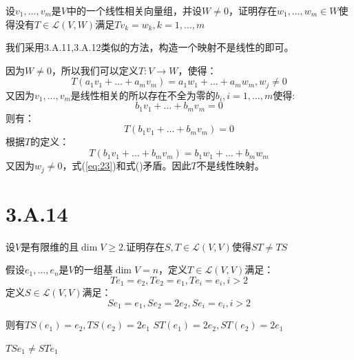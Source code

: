 \documentclass[10pt,a4paper,UTF8]{article}
\begin{document}
\begin{problem}
设\(v_{1},\ldots ,v_{m}\)是\(V\)中的一个线性相关向量组，并设\(W\neq 0\)，证明存在\(w_{1},\ldots ,w_{m}\in W\)使得没有\(T\in \mathcal{L}(V,W)\)满足\(Tv_{k} = w_{k},k=1,\ldots ,m\)
\end{problem}

\begin{answer}
我们采用3.A.11,3.A.12类似的方法，构造一个映射不是线性的即可。

因为\(W\neq 0\)，所以我们可以定义\(T:V\rightarrow W\)，使得：
\begin{equation}
\label{eq:22}
T(a_{1}v_{1} + \ldots + a_{m}v_{m}) = a_{1}w_{1} + \ldots + a_{m}w_{m}, w_{j}\neq 0
\end{equation}
又因为\(v_{1},\ldots ,v_{m}\)是线性相关的所以存在不全为零的\(b_{i},i=1,\ldots ,m\)使得:
\begin{equation}
\label{eq:23}
b_{1}v_{1} + \ldots + b_{m}v_{m} = 0
\end{equation}
则有：
\begin{equation}
\label{eq:24}
T(b_{1}v_{1} + \ldots + b_{m}v_{m}) = 0
\end{equation}
根据\(T\)的定义：
\begin{equation}
\label{eq:25}
T(b_{1}v_{1} + \ldots + b_{m}v_{m}) = b_{1}w_{1} + \ldots + b_{m}w_{m}
\end{equation}
又因为\(w_{j}\neq 0\)，式(\ref{eq:23})和式()矛盾。因此\(T\)不是线性映射。
\end{answer}

\section{3.A.14}
\label{sec:orgb67a255}


\begin{problem}
设\(V\)是有限维的且\(\dim V \geq 2\).证明存在\(S,T\in \mathcal{L}(V,V)\)使得\(ST\neq TS\)
\end{problem}

\begin{answer}
假设\(e_{1},\ldots ,e_{n}\)是\(V\)的一组基\(\dim V = n\)，定义\(T\in \mathcal{L}(V,V)\)满足：
\begin{equation}
\label{eq:26}
Te_{1} = e_{2}, Te_{2} = e_{1}, Te_{i} = e_{i}, i > 2
\end{equation}
定义\(S\in  \mathcal{L}(V,V)\)满足：
\begin{equation}
\label{eq:27}
Se_{1} = e_{1}, Se_{2} = 2 e_{2}, Se_{i} = e_{i}, i > 2
\end{equation}

则有\(TS(e_{1}) = e_{2},TS(e_{2}) = 2e_{1}\) \(ST(e_{1}) = 2e_{2},ST(e_{2}) = 2e_{1}\)

\(TSe_{1} \neq STe_{1}\)
\end{answer}
\end{document}
